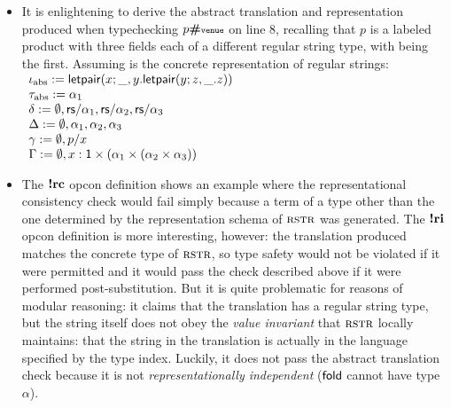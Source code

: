 \documentclass[9pt,preprint]{sigplanconf}
\newcommand{\moutput}{^{\color{gray}{+}}}
\begin{document}
\begin{itemize}
\item It is enlightening to derive the abstract translation and representation produced when typechecking $p\opname{\#}\conclbl{venue}$ on line 8, recalling that $p$ is a labeled product with three fields each of a different regular string type, with  being the first. Assuming  is the concrete representation of regular strings: $\begin{array}{l}
\iota_\text{abs} := {\sf letpair}(x; \_, y.{\sf letpair}(y; z, \_.z))\\
\tau_\text{abs} := \alpha_1\\
\delta := \emptyset, {\sf rs}/\alpha_1, {\sf rs}/\alpha_2, {\sf rs}/\alpha_3\\
\Delta := \emptyset, \alpha_1, \alpha_2, \alpha_3\\
\gamma := \emptyset, p/x\\
\Gamma := \emptyset, x : {\sf 1} \times (\alpha_1 \times (\alpha_2 \times \alpha_3))
\end{array}$
\item The $\textbf{!rc}$ opcon definition shows an example where the representational consistency check would fail simply because a term of a type other than the one determined by the representation schema of $\textsc{rstr}$ was generated. The $\textbf{!ri}$ opcon definition is more interesting, however: the translation produced matches the concrete type of $\textsc{rstr}$, so type safety would not be violated if it were permitted and it would pass the check described above if it were performed post-substitution. But it is quite problematic for reasons of modular reasoning: it claims that the translation has a regular string type, but the string itself does not obey the \emph{value invariant} that $\textsc{rstr}$ locally maintains: that the string in the translation is actually in the language specified by the type index. Luckily, it does not pass the abstract translation check because it is not \emph{representationally independent} (${\sf fold}$ cannot have type $\alpha$).
\end{itemize}



\end{document}
